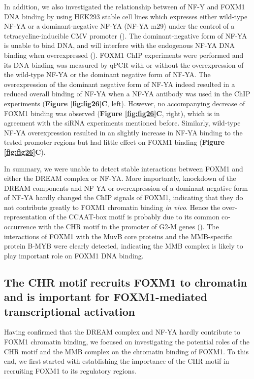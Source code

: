 In addition, we also investigated the relationship between of NF-Y and FOXM1 DNA binding by using HEK293 stable cell lines which expresses either wild-type NF-YA or a dominant-negative NF-YA (NF-YA m29) under the control of a tetracycline-inducible CMV promoter (\cite{tiwari2011a}). The dominant-negative form of NF-YA is unable to bind DNA, and will interfere with the endogenous NF-YA DNA binding when overexpressed (\cite{mantovani1994dominant}). FOXM1 ChIP experiments were performed and its DNA binding was measured by qPCR with or without the overexpression of the wild-type NF-YA or the dominant negative form of NF-YA. The overexpression of the dominant negative form of NF-YA indeed resulted in a reduced overall binding of NF-YA when a NF-YA antibody was used in the ChIP experiments (\textbf{Figure \ref{fig:fig26}C}, left). However, no accompanying decrease of FOXM1 binding was observed (\textbf{Figure \ref{fig:fig26}C}, right), which is in agreement with the siRNA experiments mentioned before. Similarly, wild-type NF-YA overexpression resulted in an slightly increase in NF-YA binding to the tested promoter regions but had little effect on FOXM1 binding (\textbf{Figure \ref{fig:fig26}C}).

In summary, we were unable to detect stable interactions between FOXM1 and either the DREAM complex or NF-YA. More importantly, knockdown of the DREAM components and NF-YA or overexpression of a dominant-negative form of NF-YA hardly changed the ChIP signals of FOXM1, indicating that they do not contribute greatly to FOXM1 chromatin binding \textit{in vivo}. Hence the over-representation of the CCAAT-box motif is probably due to its common co-occurrence with the CHR motif in the promoter of G2-M genes (\cite{müller2012the}). The interactions of FOXM1 with the MuvB core proteins and the MMB-specific protein B-MYB were clearly detected, indicating the MMB complex is likely to play important role on FOXM1 DNA binding.

\subsection{The CHR motif recruits FOXM1 to chromatin and is important for FOXM1-mediated transcriptional activation}

Having confirmed that the DREAM complex and NF-YA hardly contribute to FOXM1 chromatin binding, we focused on investigating the potential roles of the CHR motif and the MMB complex on the chromatin binding of FOXM1. To this end, we first started with establishing the importance of the CHR motif in recruiting FOXM1 to its regulatory regions.

